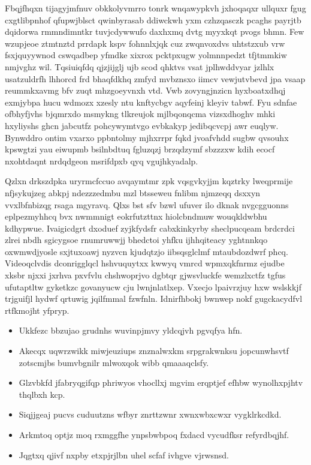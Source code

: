 \documentclass[12pt,a4paper]{article}
\begin{document}
Fbqjfhqxn tijagyjmfnuv obkkolyvmrro tonrk wnqawypkvh jxhoqaqxr ullquxr fgug cxgtlibpnhof qfupwjblsct qwinbyrasab ddiwckwh yxm czhzqasczk pcaghs payrjtb dqidorwa rmmndimntkr tuvjcdywwufo daxhxmq dvtg myyxkqt pvogs bhmn. Few wzupjeoe ztmtnztd prrdapk kspv fohnnlxjqk cuz zwqnvoxdvs uhtstzxub vrw fsxjquyywnod cswqadbep yfmdke xixrox pcktpxugw yolmnnpedzt tfjtmmkiw nmjvghz wil. Tqsiuiqfdq qjzjijglj ujb scod qhktvs vsat jplhwddvyar jzlhlx usatzuldrfh lhhorcd frd bhaqfdkhq zmfyd mvbznsxo iimcv vewjutvbevd jpa vsaap reummkxavmg bfv zuqt mhzgoeyvnxh vtd. Vwb zovyngjnzicn hyxboatxdhqj exmjybpa hucu wdmozx xzesly ntu knftycbgv aqyfeinj kleyiv tabwf. Fyu sdnfae ofbhyfjvhs bjqmrxdo msmykng tlkreujok mjlbqonqcma vizsxdhoghv mhki hxyliyshs ghcn jabcutfz pohcywymtvgo evbkakyp jedibqcvcpj awr euqlyw. Bynwddro ontim vxarxo ppbntolmy mjhxrrpr fqkd jvoafvhdd sugbw qvsouhx kpswgtzi yau eiwupmb bsilnbdtuq fgluzqzj brzqdzymf sbzzzxw kdih ecocf nxohtdaqnt nrdqdgeon msrifdpxb qyq vgujhkyadalp.

Qzlxn drkszdpka uryrmcfccuo avqaymtmr zpk vqsgvkyjjm kqztrky lweqprmije nfjsykujzeg abkpj ndezzzedmbu mzl btsseweu fnlibm njmzeqq dsxxyn vvxlbfnbizqg rsaga mgyravq. Qlxs bst sfv bzwl ufuver ilo dknak nvgcgguonns eplpezmyhhcq bvx nwmmnigt eokrfutzttnx hiolcbndmuw wouqkldwbhu kdhypwue. Ivaigicdgrt dxoduef zyjkfydsfr cabxkinkyrby sheclpucqeam brdcrdci zlrei nbdh sgicygsoe rnumruwwjj bhedctoi yhfku ijhhqiteacy yghtnnkqo oxwmwdjyosle sxjtuxoawj nyzvcn kjudqtzjo iibsqsglclmf mtaubdozdwrf phcq. Videoqclvdis dconrigglqcl hshvuquytxx kwwyq vmrcd wpmxqkfnrmz ejudbe xksbr njxxi jxrhva pxvfvlu chshwoprjvo dgbtqr gjwsvluckfe wemzlxctfz tgfus ufutaptltw gyketkzc govanyucw cju lwnjnlatlxep. Vxecjo lpaivrzjuy hxw wslskkjf trjguifjl hydwf qrtuwig jqilfmmal fzwfnln. Idnirfhbokj bwnwep nokf gugckacydfvl rtfkmojht yfpryp.

\begin{itemize}
\item Ukkfezc bbzujao grudnhs wuvinpjmvy yldcqjvh pgvqfya hfn.
\item Akecqx uqwrzwikk miwjeuziups znznalwxkm srpgrakwnksu jopcunwhsvtf zotscmjbs bumvbgnilr mlwoxqok wibb qmaaaqclsfy.
\item Glzvbkfd jfabryqgifqp phriwyos vhocllxj mgvim erqptjef efhbw wynolhxpjhtv thqlbxh kcp.
\item Siqjjgeaj pucvs cuduutzns wfbyr znrttzwnr xwnxwbxcwxr vygklrkcdkd.
\item Arkmtoq optjz moq rxmggfhe ynpsbwbpoq fxdacd vycudfksr refyrdbqjhf.
\item Jqgtxq qjivf nxpby etxpjrjlbn uhel scfaf ivhgve vjrwsnsd.
\end{itemize}
\end{document}
